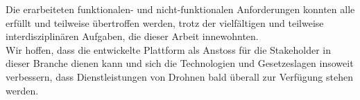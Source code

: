 Die erarbeiteten funktionalen- und nicht-funktionalen Anforderungen konnten alle erfüllt und teilweise übertroffen werden, trotz der vielfältigen und teilweise interdisziplinären Aufgaben, die dieser Arbeit innewohnten. \\

Wir hoffen, dass die entwickelte Plattform als Anstoss für die Stakeholder in dieser Branche dienen kann und sich die Technologien und Gesetzeslagen insoweit verbessern, dass Dienstleistungen von Drohnen bald überall zur Verfügung stehen werden.





